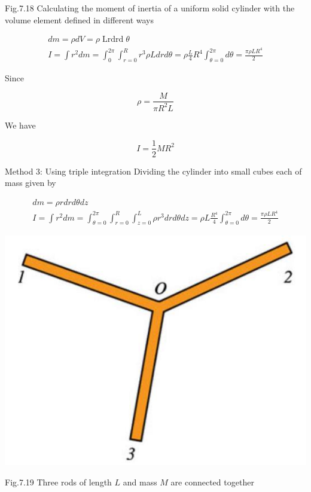 \documentclass[10pt]{article}
\begin{document}
Fig.7.18 Calculating the moment of inertia of a uniform solid cylinder with the volume element defined in different ways

$$
\begin{gathered}
d m=\rho d V=\rho \operatorname{Lrdrd} \theta \\
I=\int r^{2} d m=\int_{0}^{2 \pi} \int_{r=0}^{R} r^{3} \rho L d r d \theta=\rho \frac{L}{4} R^{4} \int_{\theta=0}^{2 \pi} d \theta=\frac{\pi \rho L R^{4}}{2}
\end{gathered}
$$

Since

$$
\rho=\frac{M}{\pi R^{2} L}
$$

We have

$$
I=\frac{1}{2} M R^{2}
$$

Method 3: Using triple integration Dividing the cylinder into small cubes each of mass given by

$$
\begin{gathered}
d m=\rho r d r d \theta d z \\
I=\int r^{2} d m=\int_{\theta=0}^{2 \pi} \int_{r=0}^{R} \int_{z=0}^{L} \rho r^{3} d r d \theta d z=\rho L \frac{R^{4}}{4} \int_{\theta=0}^{2 \pi} d \theta=\frac{\pi \rho L R^{4}}{2}
\end{gathered}
$$

\begin{center}
\includegraphics[max width=\textwidth]{2024_09_13_db1f357d2aad0a03eb2eg-121}
\end{center}

Fig.7.19 Three rods of length $L$ and mass $M$ are connected together
\end{document}
